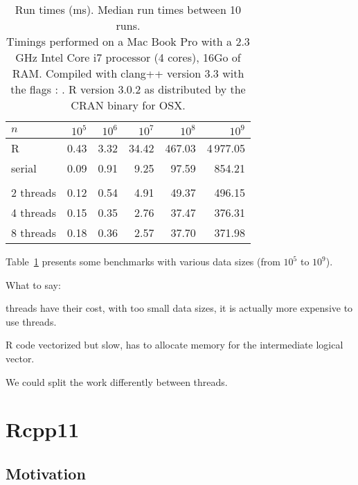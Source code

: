 \begin{table}
\centering
\begin{tabular}{lrrrrr}
\toprule 
$n$ & $10^5$ & $10^6$ & $10^7$ & $10^8$ & $10^9$ \\ 
\midrule          
R         & 0.43 & 3.32  & 34.42 & 467.03 & 4\,977.05 \\
serial    & 0.09 & 0.91  &  9.25 &  97.59 &    854.21 \\
\hspace{1.5cm} & 
\hspace{1.5cm} & 
\hspace{1.5cm} &
\hspace{1.5cm} & 
\hspace{1.5cm} & 
\hspace{1.5cm} \\
2 threads & 0.12 & 0.54  &  4.91 &  49.37 &    496.15 \\
4 threads & 0.15 & 0.35  &  2.76 &  37.47 &    376.31 \\
8 threads & 0.18 & 0.36  &  2.57 &  37.70 &    371.98 \\
\bottomrule
\end{tabular}
\caption{\label{table:count}Run times (ms). Median run times between 10 runs.\\ 
{\footnotesize Timings performed on a Mac Book Pro with a 2.3 GHz Intel Core i7 processor (4 cores), 16Go of RAM. 
Compiled with clang++ version 3.3 with the flags : . R version 3.0.2 
as distributed by the CRAN binary for OSX. }}
\end{table}

Table~\ref{table:count} presents some benchmarks with various 
data sizes (from $10^5$ to $ 10^9$). 

What to say: 

threads have their cost, with too small data sizes, it is actually more
expensive to use threads. 

R code vectorized but slow, has to allocate memory for the intermediate 
logical vector. 

We could split the work differently between threads. 

\section{Rcpp11}

\subsection{Motivation}

